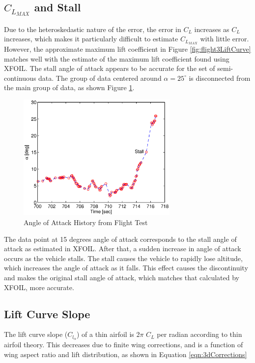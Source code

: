 \subsection{$C_{L_{MAX}}$ and Stall}
Due to the heteroskedastic nature of the error, the error in $C_L$ increases as $C_L$ increases, which makes it particularly difficult to estimate $C_{L_{MAX}}$ with little error. However, the approximate maximum lift coefficient in Figure \ref{fig:flight3LiftCurve} matches well with the estimate of the maximum lift coefficient found using XFOIL. The stall angle of attack appears to be accurate for the set of semi-continuous data. The group of data centered around $\alpha = 25^{\circ}$ is disconnected from the main group of data, as shown Figure \ref{fig:alphaStallHistory}.
\begin{figure}[H]
  \centering
    \includegraphics[width=0.7\textwidth]{figures/alphaStallHistory.eps}  \caption{Angle of Attack History from Flight Test} \label{fig:alphaStallHistory}
\end{figure}
The data point at 15 degrees angle of attack corresponds to the stall angle of attack as estimated in XFOIL. After that, a sudden increase in angle of attack occurs as the vehicle stalls. The stall causes the vehicle to rapidly lose altitude, which increases the angle of attack as it falls. This effect causes the discontinuity and makes the original stall angle of attack, which matches that calculated by XFOIL, more accurate.

\subsection{Lift Curve Slope}
The lift curve slope ($C_{l_\alpha}$) of a thin airfoil is 2$\pi$ $C_L$ per radian according to thin airfoil theory. This decreases due to finite wing corrections, and is a function of wing aspect ratio and lift distribution, as shown in Equation \ref{eqn:3dCorrections}

